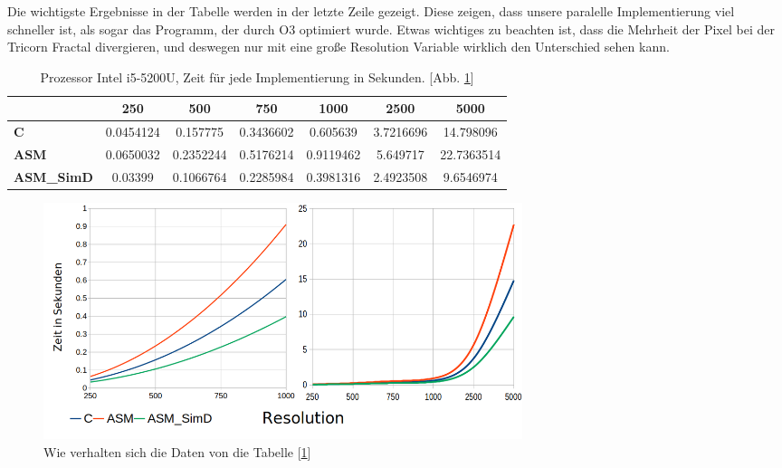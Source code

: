\documentclass[course=erap]{aspdoc}
\begin{document}
Die wichtigste Ergebnisse in der Tabelle werden in der letzte Zeile gezeigt. Diese zeigen, dass unsere paralelle Implementierung viel schneller ist, als sogar das Programm, der durch O3 optimiert wurde. Etwas wichtiges zu beachten ist, dass die Mehrheit der Pixel bei der Tricorn Fractal divergieren, und deswegen nur mit eine gro{\ss}e Resolution Variable wirklich den Unterschied sehen kann. 

\begin{table}[h!]\label{table:benchmarking}
  \begin{center}
    \label{tab:table1}
    \begin{tabular}{l|c|c|c|c|c|c}
      \textbf{} & \textbf{250} & \textbf{500} & \textbf{750} & \textbf{1000} & \textbf{2500} & \textbf{5000}\\ 
      \hline
        \rule{0pt}{25pt}\textbf{C} & 0.0454124 & 0.157775 & 0.3436602 & 0.605639 & 3.7216696 & 14.798096\\
        \hline
        \rule{0pt}{25pt}\textbf{ASM} & 0.0650032 & 0.2352244 & 0.5176214 & 0.9119462 & 5.649717 & 22.7363514\\
        \hline
        \rule{0pt}{25pt}\textbf{ASM\_SimD} & 0.03399 & 0.1066764 & 0.2285984 & 0.3981316 & 2.4923508 & 9.6546974\\

    \end{tabular}
    \caption{Prozessor Intel i5-5200U, Zeit für jede Implementierung in Sekunden. [Abb. \ref{fig:benchmark_result}]}
  \end{center}
\end{table}

\begin{figure}[ht]
    \centering
    \includegraphics[width=140mm]{img/data_benchmarking.png}
    \caption{Wie verhalten sich die Daten von die Tabelle [\ref{tab:table1}]}
    \label{fig:benchmark_result}
\end{figure}
\end{document}
